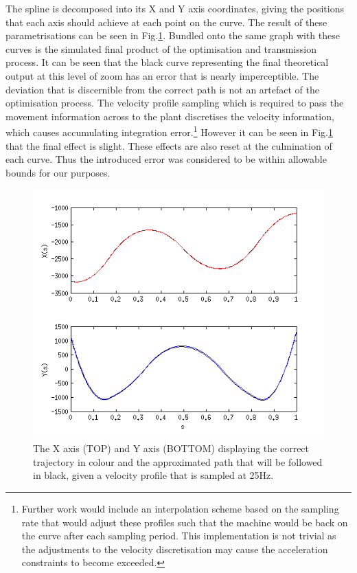 The spline is decomposed into its X and Y axis coordinates, giving the positions that each axis should achieve at each point on the curve. The result of these parametrisations can be seen in Fig.\ref{fig:xy_s}. Bundled onto the same graph with these curves is the simulated final product of the optimisation and transmission process. It can be seen that the black curve representing the final theoretical output at this level of zoom has an error that is nearly imperceptible. The deviation that is discernible from the correct path is not an artefact of the optimisation process. The velocity profile sampling which is required to pass the movement information across to the plant discretises the velocity information, which causes accumulating integration error.\footnote{Further work would include an interpolation scheme based on the sampling rate that would adjust these profiles such that the machine would be back on the curve after each sampling period. This implementation is not trivial as the adjustments to the velocity discretisation may cause the acceleration constraints to become exceeded.} However it can be seen in Fig.\ref{fig:xy_s} that the final effect is slight. These effects are also reset at the culmination of each curve. Thus the introduced error was considered to be within allowable bounds for our purposes.

\begin{figure}[htbp]
\includegraphics[width=\textwidth]{figures/optimisation/xy_s.png}
\caption[Indexed curve position and theoretical final path]{
The X axis (TOP) and Y axis (BOTTOM) displaying the correct trajectory in colour and the approximated path that will be followed in black, given a velocity profile that is sampled at 25Hz.
\label{fig:xy_s}}
\end{figure} 

